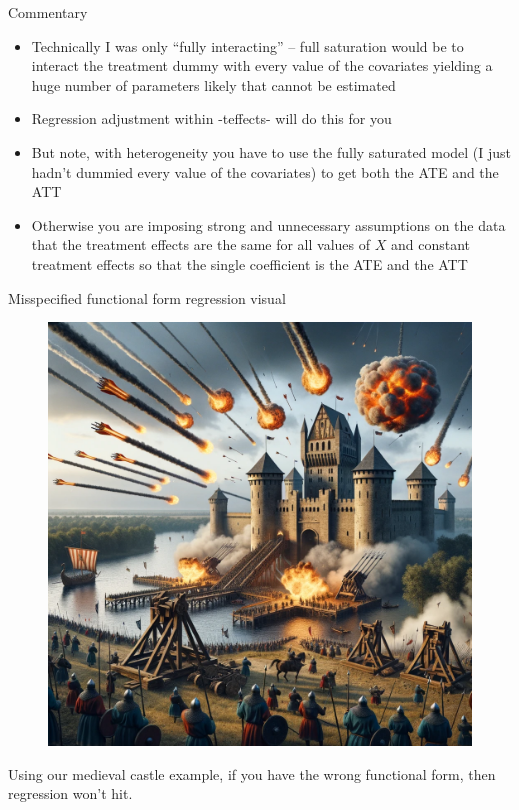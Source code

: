 \documentclass{beamer}
\begin{document}
\begin{frame}{Commentary}

\begin{itemize}

\item Technically I was only ``fully interacting'' -- full saturation would be to interact the treatment dummy with every value of the covariates yielding a huge number of parameters likely that cannot be estimated
\item Regression adjustment within -teffects- will do this for you
\item But note, with heterogeneity you have to use the fully saturated model (I just hadn't dummied every value of the covariates) to get both the ATE and the ATT
\item Otherwise you are imposing strong and unnecessary assumptions on the data that the treatment effects are the same for all values of $X$ and constant treatment effects so that the single coefficient is the ATE and the ATT

\end{itemize}

\end{frame}

\begin{frame}{Misspecified functional form regression visual}

  \begin{figure}
    \includegraphics[scale=0.17]{./lecture_includes/regression_linearity.png}
  \end{figure}
  
Using our medieval castle example, if you have the wrong functional form, then regression won't hit.

\end{frame}
\end{document}
